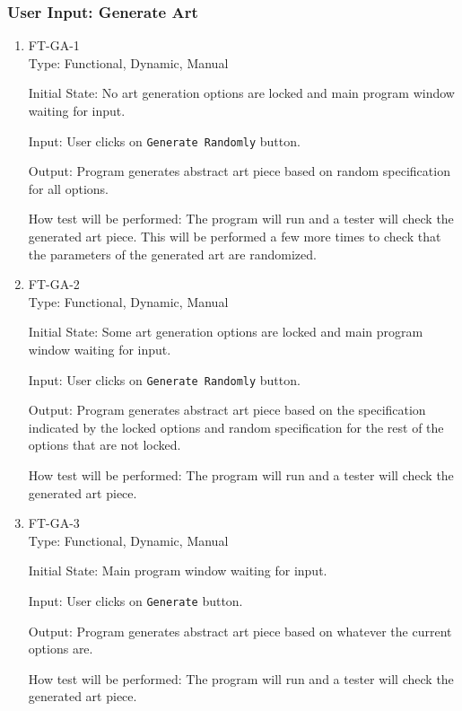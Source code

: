 \documentclass[12pt, titlepage]{article}
\begin{document}
\subsubsection{User Input: Generate Art}
\begin{enumerate}

\item{FT-GA-1\\}
Type: Functional, Dynamic, Manual

Initial State: No art generation options are locked and main program window waiting for input. %

Input: User clicks on \texttt{Generate Randomly} button.

Output: Program generates abstract art piece based on random specification for all options.

How test will be performed: The program will run and a tester will check the generated art piece. This will be performed a few more times to check that the parameters of the generated art are randomized.

\item{FT-GA-2\\}
Type: Functional, Dynamic, Manual

Initial State: Some art generation options are locked and main program window waiting for input. %

Input: User clicks on \texttt{Generate Randomly} button.

Output: Program generates abstract art piece based on the specification indicated by the locked options and random specification for the rest of the options that are not locked.

How test will be performed: The program will run and a tester will check the generated art piece.

\item{FT-GA-3\\}
Type: Functional, Dynamic, Manual

Initial State: Main program window waiting for input. %

Input: User clicks on \texttt{Generate} button.

Output: Program generates abstract art piece based on whatever the current options are.

How test will be performed: The program will run and a tester will check the generated art piece.

\end{enumerate}
\end{document}
